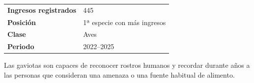 \documentclass[11pt,a4paper]{article}
\begin{document}
\vspace{0.45cm}


\begin{tcolorbox}[
colback=Beige,
colframe=ForestGreen,
title=\faChartBar\ Resultados del análisis,
fonttitle=\bfseries]

\begin{tabular}{ll}

\textbf{Ingresos registrados} & 445 \\

\textbf{Posición} & 1ª especie con más ingresos \\

\textbf{Clase} & Aves \\

\textbf{Periodo} & 2022--2025 \\

\end{tabular}

\end{tcolorbox}

\vspace{0.25cm}


\begin{tcolorbox}[
colback=Stone,
colframe=SoftGreen,
title=\faLightbulb\ ¿Sabías que...?,
fonttitle=\bfseries]

Las gaviotas son capaces de reconocer rostros humanos y
recordar durante años a las personas que consideran una
amenaza o una fuente habitual de alimento.

\end{tcolorbox}

\vspace{0.25cm}


\begin{flushright}


\end{flushright}
\end{document}
